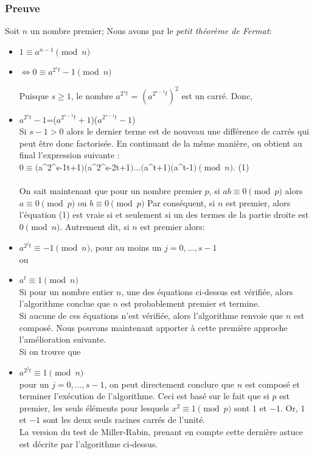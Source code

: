 		\subsubsection{Preuve}
		    Soit $n$ un nombre premier;
		    Nous avons par le \textit{petit théorème de Fermat}:
				\begin{itemize}
				\item $1 \equiv a^{n-1} \pmod n$
				\item $\Leftrightarrow 0 \equiv a^{2^{s}t}-1 \pmod n$
				
				
			 Puisque $s \geq 1$, le nombre  $a^{2^{s}t}$ = $(a^{2^{s-1}t})^{2}$ est un carré. Donc,
			  \item $a^{2^{s}t}-1$=($a^{2^{s-1}t}+1$)($a^{2^{s-1}t}-1$)\\
		
			Si $s-1 > 0$ alors le dernier terme est de nouveau une différence de carrés qui peut être donc factorisée.
            En continuant de la même manière, on obtient au final l'expression suivante :\\
            $0\equiv ($a^{2^{s-1}t}+1$)($a^{2^{s-2}t}+1$) ... ($a^{t}+1$)($a^{t}-1$)  \pmod n$.           (1)\\
            \\
            On sait maintenant que pour un nombre premier $p$, si $ab\equiv 0 \pmod p$ alors $a\equiv 0 \pmod p$ ou $b\equiv 0 \pmod p$
            Par conséquent, si $n$ est premier, alors l'équation (1) est vraie si et seulement si un des termes de la partie droite est $0 \pmod n$. Autrement dit, si $n$ est premier alors:
            
            \item $a^{2^{j}t} \equiv -1 \pmod n$, pour au moins un $j=0, ..., s-1$\\
            ou
            \item $a^{t} \equiv 1 \pmod n$\\
            
            Si pour un nombre entier $n$, une des équations ci-dessus est vérifiée, alors l'algorithme conclue que $n$ est probablement premier et termine.\\
            Si aucune de ces équations n'est vérifiée, alors l'algorithme renvoie que $n$ est composé. 
            Nous pouvons maintenant apporter à cette première approche l'amélioration suivante.\\
            
            Si on trouve que
            \item $a^{2^{j}t} \equiv 1 \pmod n$\\
            pour un $j=0, ..., s-1$, on peut directement conclure que $n$ est composé et terminer l'exécution de l'algorithme. Ceci est basé sur le fait que si $p$ est premier, les seuls éléments pour lesquels $x^{2} \equiv 1 \pmod p$ sont $1$ et $-1$. Or, $1$ et $-1$ sont les deux seuls racines carrés de l'unité.\\
            La version du test de Miller-Rabin, prenant en compte cette dernière astuce est décrite par l'algorithme ci-dessus.
            
        
			\end{itemize}

